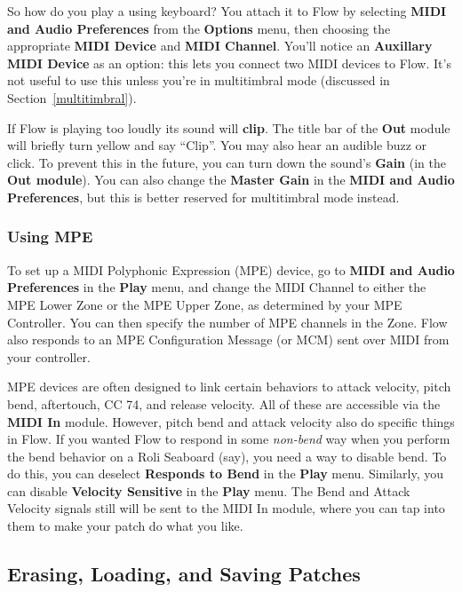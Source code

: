 \documentclass{article}
\newcommand\name{Flow}
\begin{document}
So how do you play a using keyboard?  You attach it to {\name} by selecting {\bf MIDI and Audio Preferences} from the {\bf Options} menu, then choosing the appropriate {\bf MIDI Device} and {\bf MIDI Channel}.  You'll notice an {\bf Auxillary MIDI Device} as an option: this lets you connect two MIDI devices to Flow.  It's not useful to use this unless you're in multitimbral mode (discussed in Section~\ref{multitimbral}).

If Flow is playing too loudly its sound will {\bf clip}. The title bar of the {\bf Out} module will briefly turn yellow and say ``Clip''.  You may also hear an audible buzz or click.  To prevent this in the future, you can turn down the sound's {\bf Gain} (in the {\bf Out module}).  You can also change the {\bf Master Gain} in the {\bf MIDI and Audio Preferences}, but this is better reserved for multitimbral mode instead.

\subsubsection{Using MPE}

To set up a MIDI Polyphonic Expression (MPE) device, go to {\bf MIDI and Audio Preferences} in the {\bf Play} menu, and change the MIDI Channel to either the MPE Lower Zone or the MPE Upper Zone, as determined by your MPE Controller.  You can then specify the number of MPE channels in the Zone.  {\name} also responds to an MPE Configuration Message (or MCM) sent over MIDI from your controller.

MPE devices are often designed to link certain behaviors to attack velocity, pitch bend, aftertouch, CC 74, and release velocity.  All of these are accessible via the {\bf MIDI In} module.  However, pitch bend and attack velocity also do specific things in Flow.  If you wanted Flow to respond in some {\it non-bend} way when you perform the bend behavior on a Roli Seaboard (say), you need a way to disable bend.  To do this, you can deselect {\bf Responds to Bend} in the {\bf Play} menu.  Similarly, you can disable {\bf Velocity Sensitive} in the {\bf Play} menu.  The Bend and Attack Velocity signals still will be sent to the MIDI In module, where you can tap into them to make your patch do what you like.

\subsection{Erasing, Loading, and Saving Patches}
\end{document}

